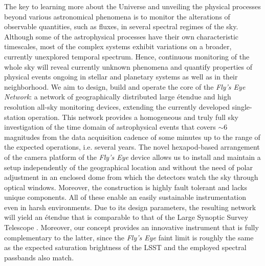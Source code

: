 The key to learning more about the Universe and unveiling the physical processes beyond various astronomical phenomena is to monitor the alterations of observable quantities, such as fluxes, in several spectral regimes of the sky. Although some of the astrophysical processes have their own characteristic timescales, most of the complex systems exhibit variations on a broader, currently unexplored temporal spectrum. Hence, continuous monitoring of the whole sky will reveal currently unknown phenomena and quantify properties of physical events ongoing in stellar and planetary systems as well as in their neighborhood. We aim to design, build and operate the core of the {\it Fly's Eye Network}: a network of geographically distributed large \'etendue and high resolution all-sky monitoring devices, extending the currently developed single-station operation. This network provides a homogeneous and truly full sky investigation of the time domain of astrophysical events that covers $\sim6$ magnitudes from the data acquisition cadence of some minutes up to the range of the expected operations, i.e. several years. The novel hexapod-based arrangement of the camera platform of the {\it Fly's Eye} device allows us to install and maintain a setup independently of the geographical location and without the need of polar adjustment in an enclosed dome from which the detectors watch the sky through optical windows. Moreover, the construction is highly fault tolerant and lacks unique components. All of these enable an easily sustainable instrumentation even in harsh environments. Due to its design parameters, the resulting network will yield an \'etendue that is comparable to that of the Large Synoptic Survey Telescope \citep[LSST,][]{ivezic2008}. Moreover, our concept provides an innovative instrument that is fully complementary to the latter, since the {\it Fly's Eye} faint limit is roughly the same as the expected saturation brightness of the LSST and the employed spectral passbands also match.

